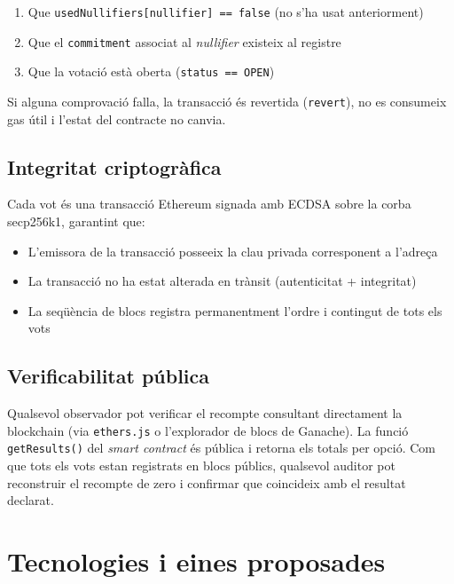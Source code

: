 \documentclass[12pt,a4paper,catalan]{article}
\begin{document}
\begin{enumerate}
    \item Que \texttt{usedNullifiers[nullifier] == false} (no s'ha usat anteriorment)
    \item Que el \texttt{commitment} associat al \textit{nullifier} existeix al registre
    \item Que la votació està oberta (\texttt{status == OPEN})
\end{enumerate}

Si alguna comprovació falla, la transacció és revertida (\texttt{revert}), no es consumeix gas útil i l'estat del contracte no canvia.

\subsection{Integritat criptogràfica}

Cada vot és una transacció Ethereum signada amb ECDSA sobre la corba secp256k1, garantint que:

\begin{itemize}
    \item L'emissora de la transacció posseeix la clau privada corresponent a l'adreça
    \item La transacció no ha estat alterada en trànsit (autenticitat + integritat)
    \item La seqüència de blocs registra permanentment l'ordre i contingut de tots els vots
\end{itemize}

\subsection{Verificabilitat pública}

Qualsevol observador pot verificar el recompte consultant directament la blockchain (via \texttt{ethers.js} o l'explorador de blocs de Ganache). La funció \texttt{getResults()} del \textit{smart contract} és pública i retorna els totals per opció. Com que tots els vots estan registrats en blocs públics, qualsevol auditor pot reconstruir el recompte de zero i confirmar que coincideix amb el resultat declarat.

\section{Tecnologies i eines proposades}
\end{document}
